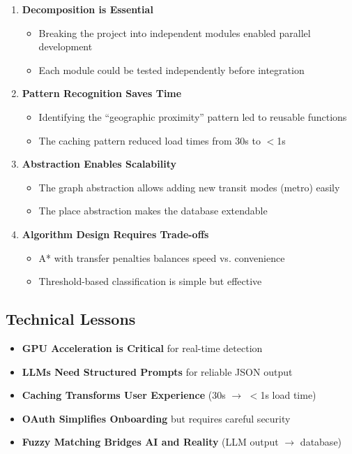 \begin{enumerate}
    \item \textbf{Decomposition is Essential}
    \begin{itemize}[noitemsep]
        \item Breaking the project into independent modules enabled parallel development
        \item Each module could be tested independently before integration
    \end{itemize}
    
    \item \textbf{Pattern Recognition Saves Time}
    \begin{itemize}[noitemsep]
        \item Identifying the ``geographic proximity'' pattern led to reusable functions
        \item The caching pattern reduced load times from 30s to $<$1s
    \end{itemize}
    
    \item \textbf{Abstraction Enables Scalability}
    \begin{itemize}[noitemsep]
        \item The graph abstraction allows adding new transit modes (metro) easily
        \item The place abstraction makes the database extendable
    \end{itemize}
    
    \item \textbf{Algorithm Design Requires Trade-offs}
    \begin{itemize}[noitemsep]
        \item A* with transfer penalties balances speed vs. convenience
        \item Threshold-based classification is simple but effective
    \end{itemize}
\end{enumerate}

\subsection{Technical Lessons}

\begin{itemize}
    \item \textbf{GPU Acceleration is Critical} for real-time detection
    \item \textbf{LLMs Need Structured Prompts} for reliable JSON output
    \item \textbf{Caching Transforms User Experience} (30s $\rightarrow$ $<$1s load time)
    \item \textbf{OAuth Simplifies Onboarding} but requires careful security
    \item \textbf{Fuzzy Matching Bridges AI and Reality} (LLM output $\rightarrow$ database)
\end{itemize}